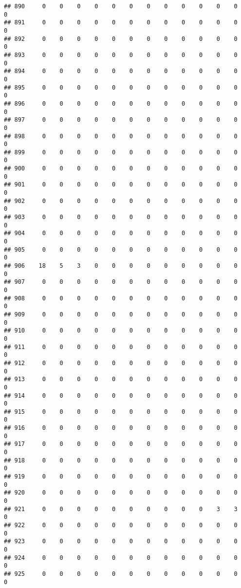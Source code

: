 \documentclass[]{article}
\begin{document}
\begin{verbatim}
## 890     0    0    0    0    0    0    0    0    0    0    0    0    0
## 891     0    0    0    0    0    0    0    0    0    0    0    0    0
## 892     0    0    0    0    0    0    0    0    0    0    0    0    0
## 893     0    0    0    0    0    0    0    0    0    0    0    0    0
## 894     0    0    0    0    0    0    0    0    0    0    0    0    0
## 895     0    0    0    0    0    0    0    0    0    0    0    0    0
## 896     0    0    0    0    0    0    0    0    0    0    0    0    0
## 897     0    0    0    0    0    0    0    0    0    0    0    0    0
## 898     0    0    0    0    0    0    0    0    0    0    0    0    0
## 899     0    0    0    0    0    0    0    0    0    0    0    0    0
## 900     0    0    0    0    0    0    0    0    0    0    0    0    0
## 901     0    0    0    0    0    0    0    0    0    0    0    0    0
## 902     0    0    0    0    0    0    0    0    0    0    0    0    0
## 903     0    0    0    0    0    0    0    0    0    0    0    0    0
## 904     0    0    0    0    0    0    0    0    0    0    0    0    0
## 905     0    0    0    0    0    0    0    0    0    0    0    0    0
## 906    18    5    3    0    0    0    0    0    0    0    0    0    0
## 907     0    0    0    0    0    0    0    0    0    0    0    0    0
## 908     0    0    0    0    0    0    0    0    0    0    0    0    0
## 909     0    0    0    0    0    0    0    0    0    0    0    0    0
## 910     0    0    0    0    0    0    0    0    0    0    0    0    0
## 911     0    0    0    0    0    0    0    0    0    0    0    0    0
## 912     0    0    0    0    0    0    0    0    0    0    0    0    0
## 913     0    0    0    0    0    0    0    0    0    0    0    0    0
## 914     0    0    0    0    0    0    0    0    0    0    0    0    0
## 915     0    0    0    0    0    0    0    0    0    0    0    0    0
## 916     0    0    0    0    0    0    0    0    0    0    0    0    0
## 917     0    0    0    0    0    0    0    0    0    0    0    0    0
## 918     0    0    0    0    0    0    0    0    0    0    0    0    0
## 919     0    0    0    0    0    0    0    0    0    0    0    0    0
## 920     0    0    0    0    0    0    0    0    0    0    0    0    0
## 921     0    0    0    0    0    0    0    0    0    0    3    3    0
## 922     0    0    0    0    0    0    0    0    0    0    0    0    0
## 923     0    0    0    0    0    0    0    0    0    0    0    0    0
## 924     0    0    0    0    0    0    0    0    0    0    0    0    0
## 925     0    0    0    0    0    0    0    0    0    0    0    0    0

\end{verbatim}
\end{document}
